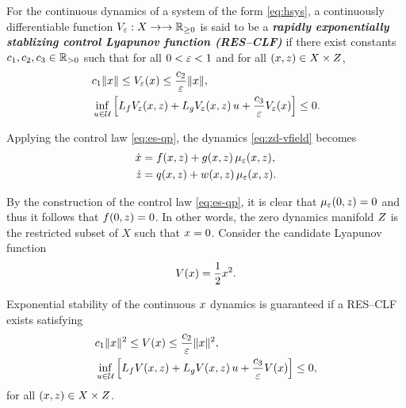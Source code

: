 \documentclass[twocolumn]{article}
\begin{document}
\begin{definition}
  For the continuous dynamics of a system of the form \eqref{eq:hsys}, a continuously differentiable function $V_{\varepsilon} : X \to \to \mathbb{R}_{\geq 0}$ is said to be a {\bf \em rapidly exponentially stablizing control Lyapunov function (RES--CLF)} if there exist constants $c_{1}, c_{2}, c_{3} \in \mathbb{R}_{> 0}$ such that for all $0 < \varepsilon < 1$ and for all $(x, z) \in X \times Z$,
  \begin{align}
  &c_{1} \| x \| \leq V_{\varepsilon}(x) \leq \frac{c_{2}}{\varepsilon} \| x \|,\\
    \nonumber
  &\inf_{u \in \mathcal{U}} \left[ L_{f} V_{\varepsilon}(x, z) + L_{g} V_{\varepsilon}(x, z) \, u + \frac{c_{3}}{\varepsilon} V_{\varepsilon}(x) \right] \leq 0.
\end{align}
\end{definition}


Applying the control law \eqref{eq:es-qp}, the dynamics \eqref{eq:zd-vfield} becomes
\begin{align}
  \nonumber
  \dot {x} &= f(x, z) + g(x, z) \, \mu_{\varepsilon}(x, z),\\
  \dot {z} &= q(x, z) + w(x, z) \, \mu_{\varepsilon}(x, z).
  \label{eq:zd-vfield-cl}
\end{align}

By the construction of the control law \eqref{eq:es-qp}, it is clear that $\mu_{\varepsilon}(0, z) = 0$ and thus it follows that $f(0, z) = 0$.
%
In other words, the zero dynamics manifold $Z$ is the restricted subset of $X$ such that $x = 0$.
%
Consider the candidate Lyapunov function
\begin{align}
  V(x) = \frac{1}{2} x^{2}.
\end{align}

\begin{proposition}  
  Exponential stability of the continuous $x$ dynamics is guaranteed if a RES--CLF exists satisfying
  \begin{align}
    \label{eq:lyap-cond-nrg-es}
    &c_{1} \| x \|^{2} \leq V(x) \leq \frac{c_{2}}{\varepsilon} \| x \|^2,\\
    \nonumber
    &\inf_{u \in \mathcal{U}} \left[ L_{f} V(x, z) + L_{g} V(x, z) \, u + \frac{c_{3}}{\varepsilon} V(x) \right] \leq 0,
  \end{align}
  for all $(x, z) \in X \times Z$.
\end{proposition}
\end{document}
